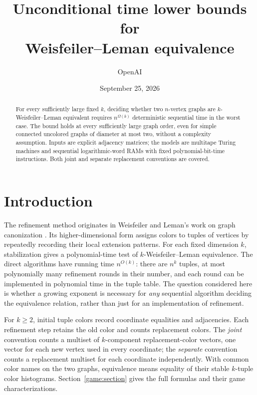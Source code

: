 \documentclass[11pt]{article}
\title{Unconditional time lower bounds for\\
Weisfeiler--Leman equivalence}
\author{OpenAI}
\date{September 25, 2026}
\theoremstyle{definition}
\theoremstyle{remark}
\numberwithin{equation}{section}
\begin{document}
\maketitle

\begin{abstract}
For every sufficiently large fixed $k$, deciding whether two
$n$-vertex graphs are $k$-Weisfeiler--Leman equivalent requires
$n^{\Omega(k)}$ deterministic sequential time in the worst case.
The bound holds at every sufficiently large graph order, even for
simple connected uncolored graphs of diameter at most two, without a
complexity assumption. Inputs are explicit adjacency matrices; the models
are multitape Turing machines and sequential logarithmic-word RAMs with
fixed polynomial-bit-time instructions. Both joint and separate replacement
conventions are covered.
\end{abstract}

\section{Introduction}\label{sec:introduction}

The refinement method originates in Weisfeiler and Leman's work on graph
canonization \cite{WL1968}. Its higher-dimensional form assigns colors to tuples of vertices
by repeatedly recording their local extension patterns. For each fixed
dimension $k$, stabilization gives a polynomial-time test of
$k$-Weisfeiler--Leman equivalence. The direct algorithms have running
time $n^{O(k)}$: there are $n^k$ tuples, at most polynomially many
refinement rounds in their number, and each round can be implemented
in polynomial time in the tuple table. The question considered here
is whether a growing exponent is necessary for \emph{any} sequential
algorithm deciding the equivalence relation, rather than just for an
implementation of refinement.

For $k\ge2$, initial tuple colors record coordinate equalities and
adjacencies. Each refinement step retains the old color and counts
replacement colors. The \emph{joint} convention counts a multiset of
$k$-component replacement-color vectors, one vector for each new vertex
used in every coordinate; the \emph{separate} convention counts a replacement multiset
for each coordinate independently. With common color names on the two
graphs, equivalence means equality of their stable $k$-tuple color
histograms. Section~\ref{game:section} gives the full formulas and their
game characterizations.
\end{document}
